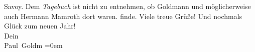 \begin{ledgroupsized}[t]{13cm}
{{{                     Savoy. Dem \emph{Tagebuch} ist nicht zu
                  entnehmen, ob Goldmann und möglicherweise
                  auch Hermann Mamroth dort waren.}}}\label{K_L03189-2h}
               finde.\pend
           \pstart
           Viele treue Grüße! Und nochmals Glück zum neuen Jahr!
               {\\[\baselineskip]}Dein {\\[\baselineskip]}\spacefill\mbox{Paul Goldm}\pend
           \leftskip=0em{}
         
         \endnumbering{}\end{ledgroupsized}  \newcommand{\dateiname}{L03189}\newcommand{\titel}{Paul Goldmann an Arthur Schnitzler, 1. 1. [1902]}\newcommand{\editorInnen}{Martin Anton Müller und Laura Untner}
      